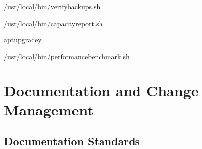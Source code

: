 \documentclass[letterpaper,10pt,english]{sphinxmanual}
\begin{document}
\sphinxAtStartPar
{}

\begin{sphinxVerbatim}[commandchars=\\\{\}]

/usr/local/bin/verify\PYGZhy{}backups.sh

/usr/local/bin/capacity\PYGZhy{}report.sh

aptupgrade\PYGZhy{}y

/usr/local/bin/performance\PYGZhy{}benchmark.sh
\end{sphinxVerbatim}


\section{Documentation and Change Management}
\label{\detokenize{best-practices:documentation-and-change-management}}

\subsection{Documentation Standards}
\label{\detokenize{best-practices:documentation-standards}}
\sphinxAtStartPar
{}
\end{document}

